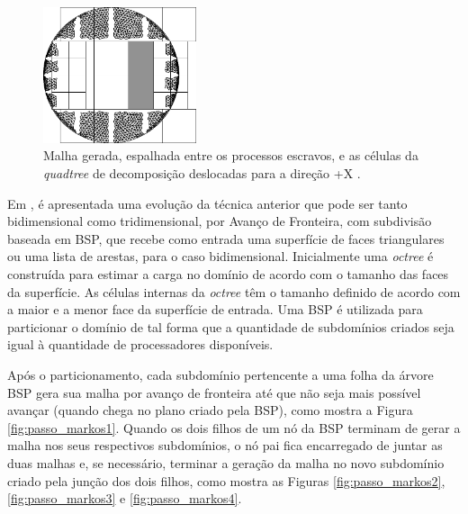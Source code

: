     \begin{figure}[htbp]
    	\centering
    	\includegraphics[width=0.4\textwidth]{fig/decomposition_quadtree_shift.png}
    	\caption{ Malha gerada, espalhada entre os processos escravos, e as células da \textit{quadtree} de decomposição deslocadas para a direção +X \cite{bib:MFreitas13}.}
    	\label{fig:mfreitas}
    \end{figure}
    
    
    Em \cite{bib:RepMarkos13}, é apresentada uma evolução da técnica anterior que pode ser tanto bidimensional como tridimensional, por Avanço de Fronteira, com subdivisão baseada em BSP, que recebe como entrada uma superfície de faces triangulares ou uma lista de arestas, para o caso bidimensional. Inicialmente uma \textit{octree} é construída para estimar a carga no domínio de acordo com o tamanho das faces da superfície. As células internas da \textit{octree} têm o tamanho definido de acordo com a maior e a menor face da superfície de entrada. Uma BSP é utilizada para particionar o domínio de tal forma que a quantidade de subdomínios criados seja igual à quantidade de processadores disponíveis.
    
    Após o particionamento, cada subdomínio pertencente a uma folha da árvore BSP gera sua malha por avanço de fronteira até que não seja mais possível avançar (quando chega no plano criado pela BSP), como mostra a Figura \ref{fig:passo_markos1}. Quando os dois filhos de um nó da BSP terminam de gerar a malha nos seus respectivos subdomínios, o nó pai fica encarregado de juntar as duas malhas e, se necessário, terminar a geração da malha no novo subdomínio criado pela junção dos dois filhos, como mostra as Figuras \ref{fig:passo_markos2}, \ref{fig:passo_markos3} e \ref{fig:passo_markos4}.
    
